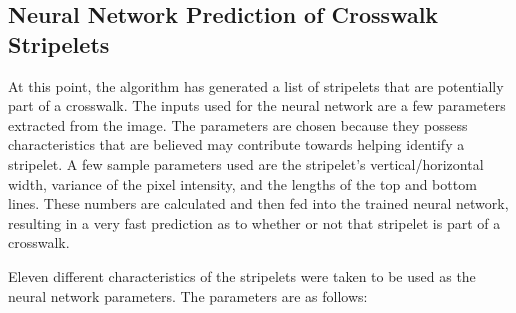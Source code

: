 \documentclass[12pt]{ucthesis}
\begin{document}
\subsection{Neural Network Prediction of Crosswalk Stripelets}


At this point, the algorithm has generated a list of stripelets that are potentially part of a crosswalk. The inputs used for the neural network are a few parameters extracted from the image. The parameters are chosen because they possess characteristics that are believed may contribute towards helping identify a stripelet. A few sample parameters used are the stripelet's vertical/horizontal width, variance of the pixel intensity, and the lengths of the top and bottom lines. These numbers are calculated and then fed into the trained neural network, resulting in a very fast prediction as to whether or not that stripelet is part of a crosswalk.


Eleven different characteristics of the stripelets were taken to be used as the neural network parameters. The parameters are as follows:
\end{document}
